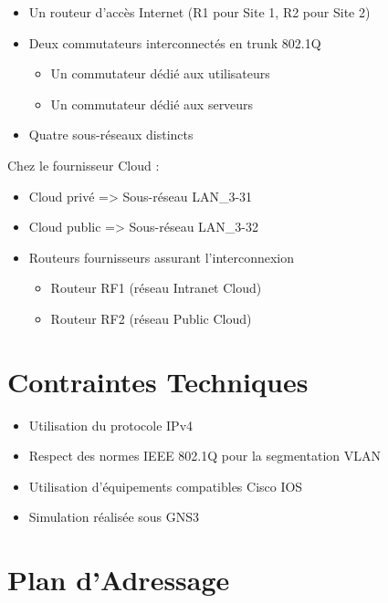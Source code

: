 \documentclass[11pt,a4paper]{memoir}%
\begin{document}
		\begin{itemize}[label=$\bullet$]
			\item Un routeur d’accès Internet (R1 pour Site 1, R2 pour Site 2)
			\item Deux commutateurs interconnectés en trunk 802.1Q
			\begin{itemize}
				\item Un commutateur dédié aux utilisateurs
				\item Un commutateur dédié aux serveurs
			\end{itemize}
			\item Quatre sous-réseaux distincts
		\end{itemize}
		
		Chez le fournisseur Cloud :
		
		\begin{itemize}[label=$\bullet$]
			\item Cloud privé => Sous-réseau LAN\_3-31
			\item Cloud public => Sous-réseau LAN\_3-32
			\item Routeurs fournisseurs assurant l'interconnexion
			\begin{itemize}
				\item Routeur RF1 (réseau Intranet Cloud)
				\item Routeur RF2 (réseau Public Cloud)
			\end{itemize}
		\end{itemize}


	\section{Contraintes Techniques}

		\begin{itemize}
			\item Utilisation du protocole IPv4	
			\item Respect des normes IEEE 802.1Q pour la segmentation VLAN
			\item Utilisation d’équipements compatibles Cisco IOS
			\item Simulation réalisée sous GNS3
		\end{itemize}

	
	\section{Plan d’Adressage}
	
\end{document}
